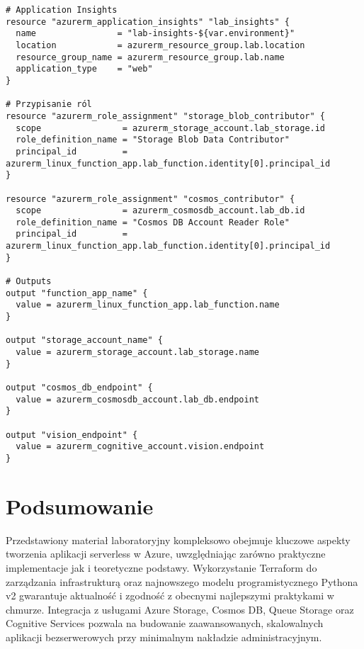 \documentclass{article}
\begin{document}
\begin{lstlisting}[]
# Application Insights
resource "azurerm_application_insights" "lab_insights" {
  name                = "lab-insights-${var.environment}"
  location            = azurerm_resource_group.lab.location
  resource_group_name = azurerm_resource_group.lab.name
  application_type    = "web"
}

# Przypisanie ról
resource "azurerm_role_assignment" "storage_blob_contributor" {
  scope                = azurerm_storage_account.lab_storage.id
  role_definition_name = "Storage Blob Data Contributor"
  principal_id         = azurerm_linux_function_app.lab_function.identity[0].principal_id
}

resource "azurerm_role_assignment" "cosmos_contributor" {
  scope                = azurerm_cosmosdb_account.lab_db.id
  role_definition_name = "Cosmos DB Account Reader Role"
  principal_id         = azurerm_linux_function_app.lab_function.identity[0].principal_id
}

# Outputs
output "function_app_name" {
  value = azurerm_linux_function_app.lab_function.name
}

output "storage_account_name" {
  value = azurerm_storage_account.lab_storage.name
}

output "cosmos_db_endpoint" {
  value = azurerm_cosmosdb_account.lab_db.endpoint
}

output "vision_endpoint" {
  value = azurerm_cognitive_account.vision.endpoint
}
\end{lstlisting}

\section*{Podsumowanie}
Przedstawiony materiał laboratoryjny kompleksowo obejmuje kluczowe aspekty tworzenia aplikacji serverless w Azure, uwzględniając zarówno praktyczne implementacje jak i teoretyczne podstawy. Wykorzystanie Terraform do zarządzania infrastrukturą oraz najnowszego modelu programistycznego Pythona v2 gwarantuje aktualność i zgodność z obecnymi najlepszymi praktykami w chmurze. Integracja z usługami Azure Storage, Cosmos DB, Queue Storage oraz Cognitive Services pozwala na budowanie zaawansowanych, skalowalnych aplikacji bezserwerowych przy minimalnym nakładzie administracyjnym.
\end{document}

